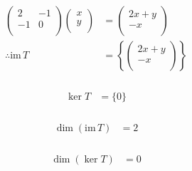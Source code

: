 \documentclass[fleqn, a4paper]{amsart}
\theoremstyle{definition}
\theoremstyle{theorem}
\theoremstyle{remark}
\newcommand{\im}{\mathrm{im}\,}
\numberwithin{corollary}{theorem}
\numberwithin{equation}{theorem}
\begin{document}
\begin{multicols}{1}
\subsubsection{}

\begin{align*}
		\begin{pmatrix}
			2 & -1\\
			-1 & 0\\
		\end{pmatrix}
		\begin{pmatrix}
			x\\
			y\\
		\end{pmatrix}
	&=
		\begin{pmatrix}
			2x + y\\
			-x\\
		\end{pmatrix}\\
	\therefore \im T & = 
		\left\lbrace
			\begin{pmatrix}
				2x + y\\
				-x\\
			\end{pmatrix}
		\right\rbrace
\end{align*}

\subsubsection{}

\begin{align*}
	\ker T &= \{0\}
\end{align*}

\subsubsection{}

\begin{align*}
	\dim (\im T) &= 2
\end{align*}

\subsubsection{}

\begin{align*}
	\dim (\ker T) &= 0
\end{align*}

\subsection{}


\end{multicols}
\end{document}
